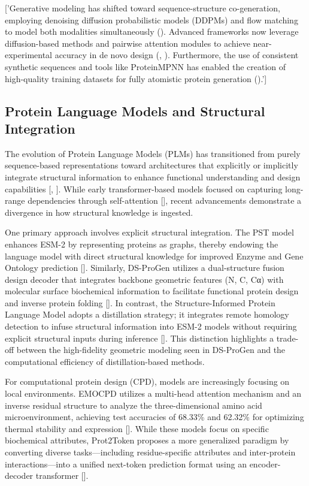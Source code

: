 \documentclass[11pt]{article}
\begin{document}
['Generative modeling has shifted toward sequence-structure co-generation, employing denoising diffusion probabilistic models (DDPMs) and flow matching to model both modalities simultaneously (\citep{2410.01773}). Advanced frameworks now leverage diffusion-based methods and pairwise attention modules to achieve near-experimental accuracy in de novo design (\citep{2503.13522}, \citep{2502.19173}). Furthermore, the use of consistent synthetic sequences and tools like ProteinMPNN has enabled the creation of high-quality training datasets for fully atomistic protein generation (\citep{2512.01976}).']
\subsection{Protein Language Models and Structural Integration}

The evolution of Protein Language Models (PLMs) has transitioned from purely sequence-based representations toward architectures that explicitly or implicitly integrate structural information to enhance functional understanding and design capabilities [\citep{2502.17504}, \citep{2505.20098}]. While early transformer-based models focused on capturing long-range dependencies through self-attention [\citep{2505.20098}], recent advancements demonstrate a divergence in how structural knowledge is ingested.

One primary approach involves explicit structural integration. The PST model enhances ESM-2 by representing proteins as graphs, thereby endowing the language model with direct structural knowledge for improved Enzyme and Gene Ontology prediction [\citep{2401.14819}]. Similarly, DS-ProGen utilizes a dual-structure fusion design decoder that integrates backbone geometric features (N, C, Cα) with molecular surface biochemical information to facilitate functional protein design and inverse protein folding [\citep{2505.12511}]. In contrast, the Structure-Informed Protein Language Model adopts a distillation strategy; it integrates remote homology detection to infuse structural information into ESM-2 models without requiring explicit structural inputs during inference [\citep{2402.05856}]. This distinction highlights a trade-off between the high-fidelity geometric modeling seen in DS-ProGen and the computational efficiency of distillation-based methods.

For computational protein design (CPD), models are increasingly focusing on local environments. EMOCPD utilizes a multi-head attention mechanism and an inverse residual structure to analyze the three-dimensional amino acid microenvironment, achieving test accuracies of 68.33\% and 62.32\% for optimizing thermal stability and expression [\citep{2410.21069}]. While these models focus on specific biochemical attributes, Prot2Token proposes a more generalized paradigm by converting diverse tasks—including residue-specific attributes and inter-protein interactions—into a unified next-token prediction format using an encoder-decoder transformer [\citep{2505.20589}].
\end{document}
